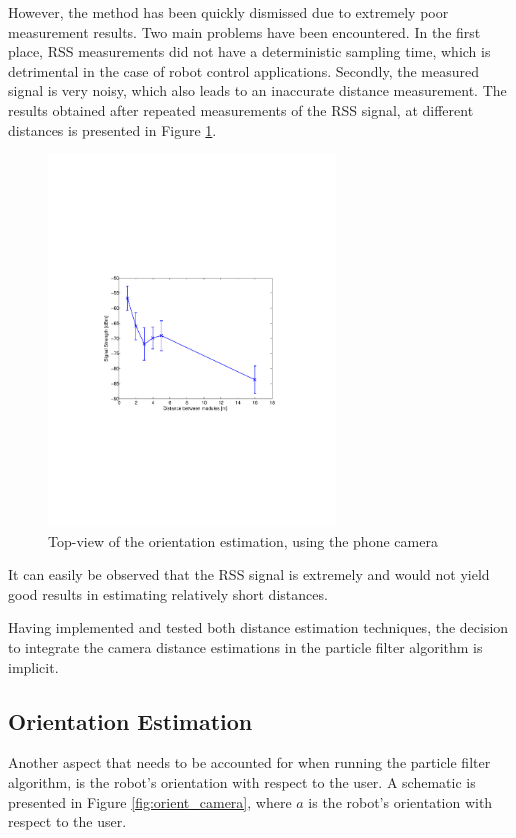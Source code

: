 \documentclass[journal]{IEEEtran}
\let\MYoriglatexcaption\caption
\renewcommand{\caption}[2][\relax]{\MYoriglatexcaption[#2]{#2}}
\begin{document}
However, the method has been quickly dismissed due to extremely poor measurement results. Two main problems have been encountered. In the first place, RSS measurements did not have a deterministic sampling time, which is detrimental in the case of robot control applications. Secondly, the measured signal is very noisy, which also leads to an inaccurate distance measurement. The results obtained after repeated measurements of the RSS signal, at different distances is presented in Figure \ref{fig:rss}.
\begin{figure}[!htpb]
\centering
\includegraphics[width=3in]{images/rss_variance}
\caption{Top-view of the orientation estimation, using the phone camera}
\label{fig:rss}
\end{figure}

It can easily be observed that the RSS signal is extremely and would not yield good results in estimating relatively short distances.

Having implemented and tested both distance estimation techniques, the decision to integrate the camera distance estimations in the particle filter algorithm is implicit.

\subsection{Orientation Estimation}

Another aspect that needs to be accounted for when running the particle filter algorithm, is the robot's orientation with respect to the user. A schematic is presented in Figure \ref{fig:orient_camera}, where $a$ is the robot's orientation with respect to the user.
\end{document}
